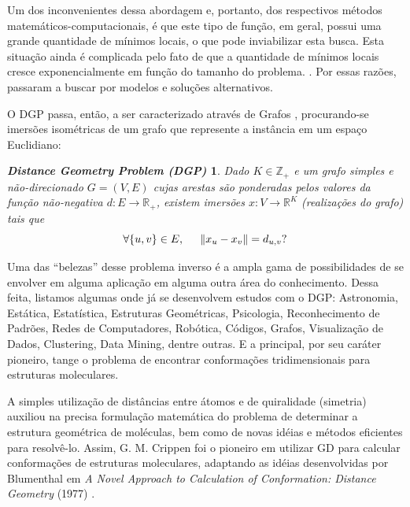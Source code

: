 \documentclass[11pt]{article}
\newtheorem*{DGP}{{\emph{Distance Geometry Problem (DGP)}}}
\begin{document}
{Um dos inconvenientes dessa abordagem e, portanto, dos respectivos métodos matemáticos-computacionais, é que este tipo de função, em geral, possui uma grande quantidade de mínimos locais, o que pode inviabilizar esta busca. Esta situação ainda é complicada pelo fato de que a quantidade de mínimos locais cresce exponencialmente em função do tamanho do problema. \cite{Survey:12,LavorCNMAC:14}. Por essas razões, passaram a buscar por modelos e soluções alternativos.

O DGP passa, então, a ser caracterizado através de Grafos \cite{Survey:12}, procurando-se imersões isométricas de um grafo que represente a instância em um espaço Euclidiano:

\begin{center}
	\begin{minipage}{0.9 \linewidth}
		\begin{DGP}
			Dado $K \in \mathbb{Z}_{+}$ e um grafo simples e não-direcionado $G = (V,E)$ cujas arestas são ponderadas pelos valores da função não-negativa $d: E \longrightarrow \mathbb{R}_{+}$, existem imersões $x:V \longrightarrow \mathbb{R}^{K}$ (realizações do grafo) tais que
			\begin{equation}
			\forall \{u,v\} \in E, \hspace{0.5cm} \left\| x_{u} - x_{v} \right\| = d_{u,v}? \label{eq:DGPdef}
			\end{equation}
		\end{DGP}
	\end{minipage}
\end{center}

Uma das ``belezas'' desse problema inverso é a ampla gama de possibilidades de se envolver em alguma aplicação em alguma outra área do conhecimento. Dessa feita, listamos algumas onde já se desenvolvem estudos com o DGP: Astronomia, Estática, Estatística, Estruturas Geométricas, Psicologia, Reconhecimento de Padrões, Redes de Computadores, Robótica, Códigos, Grafos, Visualização de Dados, Clustering, Data Mining, dentre outras. E a principal, por seu caráter pioneiro, tange o problema de encontrar conformações tridimensionais para estruturas moleculares.

A simples utilização de distâncias entre átomos e de quiralidade (simetria) auxiliou na precisa formulação matemática do problema de determinar a estrutura geométrica de moléculas, bem como de novas idéias e métodos eficientes para resolvê-lo. Assim, G. M. Crippen foi o pioneiro em utilizar GD para calcular conformações de estruturas moleculares, adaptando as idéias desenvolvidas por Blumenthal em {\emph{A Novel Approach to Calculation of Conformation: Distance Geometry}} (1977) \cite{Crippen:77}.

}
\end{document}
